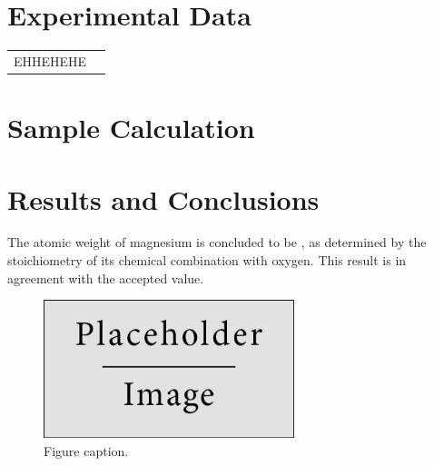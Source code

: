 \documentclass{article}
\begin{document}
\section{Experimental Data}

\begin{tabular}{ll}
EHHEHEHE
\end{tabular}


\section{Sample Calculation}



\section{Results and Conclusions}

The atomic weight of magnesium is concluded to be , as determined by the stoichiometry of its chemical combination with oxygen. This result is in agreement with the accepted value.

\begin{figure}[h]
\begin{center}
\includegraphics[width=0.65\textwidth]{placeholder} %
\caption{Figure caption.}
\end{center}
\end{figure}

\end{document}
